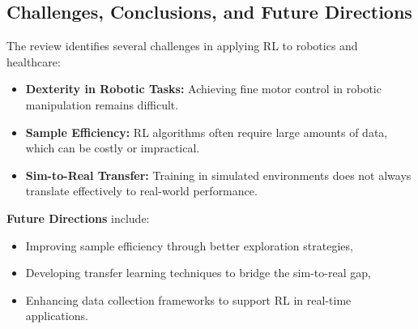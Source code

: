 \subsection*{Challenges, Conclusions, and Future Directions}
The review identifies several challenges in applying RL to robotics and healthcare:
\begin{itemize}
    \item \textbf{Dexterity in Robotic Tasks:} Achieving fine motor control in robotic manipulation remains difficult.
    \item \textbf{Sample Efficiency:} RL algorithms often require large amounts of data, which can be costly or impractical.
    \item \textbf{Sim-to-Real Transfer:} Training in simulated environments does not always translate effectively to real-world performance.
\end{itemize}

\noindent\textbf{Future Directions} include:
\begin{itemize}
    \item Improving sample efficiency through better exploration strategies,
    \item Developing transfer learning techniques to bridge the sim-to-real gap,
    \item Enhancing data collection frameworks to support RL in real-time applications.
\end{itemize}
